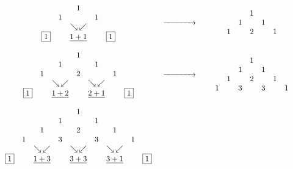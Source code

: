 \documentclass{ximera}
\begin{document}
\[ \begin{array}{ccc}

\begin{array}{ccccccccc} 
&	&	&	&	1	&	&	&	&	\\ 
&	&	&	1	&	&	1	&	&	&\\
&	&	&	&	\searrow \, \swarrow &	&	&	&	\\ 
&	&	\fbox{1}	&	&	\underline{1+1}	&	& 	\fbox{1}	&	&\\
\end{array} 

&

\xrightarrow{\hspace{.5in}}

&


\begin{array}{ccccccccc} 
&	&	&	&	1	&	&	&	&	\\ 
&	&	&	1	&	&	1	&	&	&\\
&	&	1	&	&	2	&	&1	&	&\\
\end{array} \\

&& \\

\begin{array}{ccccccccc} 
&	&	&	&	1	&	&	&	&	\\ 
&	&	&	1	&	&	1	&	&	&\\
&	&	1	&	&	2	&	&1	&	&\\ 
& &  & 	\searrow \, \swarrow & & 	\searrow \, \swarrow & &  & \\ 
&		\fbox{1}	&	&	\underline{1+2}	&	&	\underline{2+1}	&	&		\fbox{1}	&	\\
\end{array} 

&

\xrightarrow{\hspace{.5in}}

&

\begin{array}{ccccccccc} 
&	&	&	&	1	&	&	&	&	\\ 
&	&	&	1	&	&	1	&	&	&\\
&	&	1	&	&	2	&	&1	&	&\\ 
&	1	&	&	3	&	&	3	&	&	1	&	\\
\end{array} \\

&& \\

\begin{array}{ccccccccc} 
&	&	&	&	1	&	&	&	&	\\ 
&	&	&	1	&	&	1	&	&	&\\
&	&	1	&	& 2	&	&1	&	&\\ 
&	1	&	&	3	&	& 3	&	&	1	&	\\ 
&	&	\searrow \, \swarrow 	&	&	\searrow \, \swarrow 	&	&	\searrow \, \swarrow 	&	& \\ 
	\fbox{1}	&	&	\underline{1+3}	&	&	\underline{3+3}	&	&	\underline{3+1}	&	&		\fbox{1} \\ 


\end{array}
\end{array}\]
\end{document}
